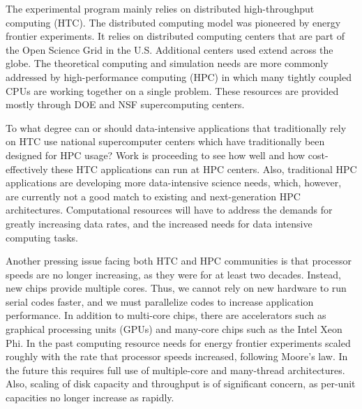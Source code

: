 The experimental program mainly relies on distributed
high-throughput computing (HTC). 
The distributed computing model was pioneered by energy frontier
experiments.  It relies on distributed computing
centers that are part of the Open Science Grid in the U.S.  
Additional centers used extend across the globe. 
The theoretical computing and simulation needs are more commonly
addressed by high-performance computing (HPC) in which many
tightly coupled CPUs are working together on a single
problem. These resources are provided mostly through DOE and NSF
supercomputing centers.

To what degree can or should data-intensive applications that traditionally 
rely on HTC use national supercomputer centers which have traditionally 
been designed for HPC usage?
Work is proceeding to see how well and how cost-effectively these HTC
applications can run at HPC centers.
Also, traditional HPC applications are developing more data-intensive
science needs, which, however, are currently not a good match to existing
and next-generation HPC architectures. Computational resources will have to
address the demands for greatly increasing data rates, and the increased
needs for data intensive computing tasks.

Another pressing issue facing both HTC and HPC communities is that
processor speeds are no longer increasing, as they were for
at least two decades. Instead, new chips provide multiple
cores. Thus, we cannot rely on new hardware to run serial codes faster, and
we must parallelize codes to increase application performance. In addition
to multi-core chips, there are accelerators such as graphical processing
units (GPUs) and many-core chips such as the Intel Xeon Phi. 
In the past computing resource needs for energy frontier experiments scaled
roughly with the rate that processor speeds increased, following Moore's
law. In the future this requires full use of multiple-core and many-thread 
architectures. Also,
scaling of disk capacity and throughput is of
significant concern, as per-unit capacities no longer increase as rapidly.

